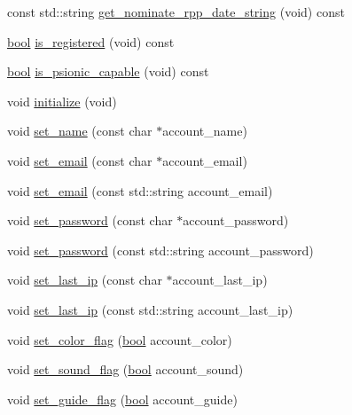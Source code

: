 \begin{DoxyCompactItemize}
const std\-::string \hyperlink{classaccount_a86bd584f41fc85cdf6b5c08f5d646bae}{get\-\_\-nominate\-\_\-rpp\-\_\-date\-\_\-string} (void) const 
\item 
\hyperlink{structs_8h_ad5c9d4ba3dc37783a528b0925dc981a0}{bool} \hyperlink{classaccount_aca26766792b246602bae438cbeca3428}{is\-\_\-registered} (void) const 
\item 
\hyperlink{structs_8h_ad5c9d4ba3dc37783a528b0925dc981a0}{bool} \hyperlink{classaccount_a64fd2bc0153983a53c19950b88cdc7a7}{is\-\_\-psionic\-\_\-capable} (void) const 
\item 
void \hyperlink{classaccount_a84b9499eb811cc859ecd1825906b6b49}{initialize} (void)
\item 
void \hyperlink{classaccount_ab8ddeefc071a39f28a778c7e353c22e2}{set\-\_\-name} (const char $\ast$account\-\_\-name)
\item 
void \hyperlink{classaccount_a055dd7ec6b8b20d6a25ba99e8a756162}{set\-\_\-email} (const char $\ast$account\-\_\-email)
\item 
void \hyperlink{classaccount_a6c387f44d3f77c3261c88346417940e0}{set\-\_\-email} (const std\-::string account\-\_\-email)
\item 
void \hyperlink{classaccount_a24a3091030b376ed6ce5e9191f6869d0}{set\-\_\-password} (const char $\ast$account\-\_\-password)
\item 
void \hyperlink{classaccount_a50bc1922ef23018fc1e09ae4844c906a}{set\-\_\-password} (const std\-::string account\-\_\-password)
\item 
void \hyperlink{classaccount_a2e5fab61ce141ebb4ad25e27ccacbcf1}{set\-\_\-last\-\_\-ip} (const char $\ast$account\-\_\-last\-\_\-ip)
\item 
void \hyperlink{classaccount_a5de1f206c48cd36e5442c6ac70846bc4}{set\-\_\-last\-\_\-ip} (const std\-::string account\-\_\-last\-\_\-ip)
\item 
void \hyperlink{classaccount_a841ded037dd27811984898165f085281}{set\-\_\-color\-\_\-flag} (\hyperlink{structs_8h_ad5c9d4ba3dc37783a528b0925dc981a0}{bool} account\-\_\-color)
\item 
void \hyperlink{classaccount_ac02f709994fdedeb88d038f9303b51ec}{set\-\_\-sound\-\_\-flag} (\hyperlink{structs_8h_ad5c9d4ba3dc37783a528b0925dc981a0}{bool} account\-\_\-sound)
\item 
void \hyperlink{classaccount_acf2fe805f4d715a3a94911d4125b30d5}{set\-\_\-guide\-\_\-flag} (\hyperlink{structs_8h_ad5c9d4ba3dc37783a528b0925dc981a0}{bool} account\-\_\-guide)
\item 

\end{DoxyCompactItemize}
